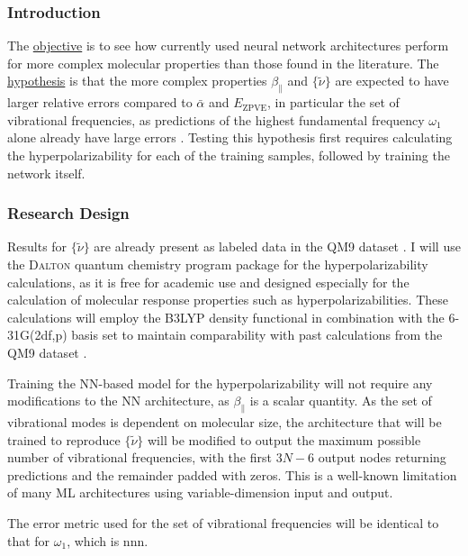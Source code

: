 \documentclass[12pt]{article}
\begin{document}
\subsubsection{Introduction}
\label{sec:orgad249fd}

The \uline{objective} is to see how currently used neural network architectures perform for more complex molecular properties than those found in the literature. The \uline{hypothesis} is that the more complex properties \(\beta_{\parallel}\) and \(\{\tilde{\nu}\}\) are expected to have larger relative errors compared to \(\bar{\alpha}\) and \(E_{\text{ZPVE}}\), in particular the set of vibrational frequencies, as predictions of the highest fundamental frequency \(\omega_1\) alone already have large errors \cite{2017arXiv170205532F}. Testing this hypothesis first requires calculating the hyperpolarizability for each of the training samples, followed by training the network itself.

\subsubsection{Research Design}
\label{sec:orgb5a63be}

Results for \(\{\tilde{\nu}\}\) are already present as labeled data in the QM9 dataset \cite{Ramakrishnan:2014ij}. I will use the \textsc{Dalton} quantum chemistry program package \cite{daltonpaper} for the hyperpolarizability calculations, as it is free for academic use and designed especially for the calculation of molecular response properties such as hyperpolarizabilities. These calculations will employ the B3LYP density functional in combination with the 6-31G(2df,p) basis set to maintain comparability with past calculations from the QM9 dataset \cite{Ramakrishnan:2014ij}.

Training the NN-based model for the hyperpolarizability will not require any modifications to the NN architecture, as \(\beta_{\parallel}\) is a scalar quantity. As the set of vibrational modes is dependent on molecular size, the architecture that will be trained to reproduce \(\{\tilde{\nu}\}\) will be modified to output the maximum possible number of vibrational frequencies, with the first \(3N-6\) output nodes returning predictions and the remainder padded with zeros. This is a well-known limitation of many ML architectures using variable-dimension input and output.

The error metric used for the set of vibrational frequencies will be identical to that for \(\omega_1\), which is nnn.
\end{document}
